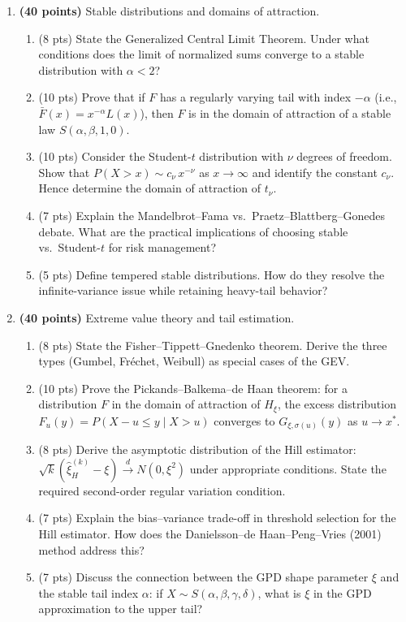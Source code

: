 \documentclass[11pt, a4paper]{article}
\theoremstyle{definition}
\begin{document}
\begin{enumerate}[label=\textbf{PhD-Q\arabic*.}]

\item \textbf{(40 points)} Stable distributions and domains of attraction.

\begin{enumerate}[label=(\alph*)]
  \item (8 pts) State the Generalized Central Limit Theorem. Under what conditions does the limit of normalized sums converge to a stable distribution with $\alpha < 2$?
  \item (10 pts) Prove that if $F$ has a regularly varying tail with index $-\alpha$ (i.e., $\bar{F}(x) = x^{-\alpha}L(x)$), then $F$ is in the domain of attraction of a stable law $S(\alpha, \beta, 1, 0)$.
  \item (10 pts) Consider the Student-$t$ distribution with $\nu$ degrees of freedom. Show that $P(X > x) \sim c_\nu\,x^{-\nu}$ as $x \to \infty$ and identify the constant $c_\nu$. Hence determine the domain of attraction of $t_\nu$.
  \item (7 pts) Explain the Mandelbrot--Fama vs.\ Praetz--Blattberg--Gonedes debate. What are the practical implications of choosing stable vs.\ Student-$t$ for risk management?
  \item (5 pts) Define tempered stable distributions. How do they resolve the infinite-variance issue while retaining heavy-tail behavior?
\end{enumerate}

\item \textbf{(40 points)} Extreme value theory and tail estimation.

\begin{enumerate}[label=(\alph*)]
  \item (8 pts) State the Fisher--Tippett--Gnedenko theorem. Derive the three types (Gumbel, Fréchet, Weibull) as special cases of the GEV.
  \item (10 pts) Prove the Pickands--Balkema--de Haan theorem: for a distribution $F$ in the domain of attraction of $H_\xi$, the excess distribution $F_u(y) = P(X - u \leq y \mid X > u)$ converges to $G_{\xi, \sigma(u)}(y)$ as $u \to x^*$.
  \item (8 pts) Derive the asymptotic distribution of the Hill estimator: $\sqrt{k}(\hat{\xi}_H^{(k)} - \xi) \xrightarrow{d} N(0, \xi^2)$ under appropriate conditions. State the required second-order regular variation condition.
  \item (7 pts) Explain the bias--variance trade-off in threshold selection for the Hill estimator. How does the Danielsson--de Haan--Peng--Vries (2001) method address this?
  \item (7 pts) Discuss the connection between the GPD shape parameter $\xi$ and the stable tail index $\alpha$: if $X \sim S(\alpha, \beta, \gamma, \delta)$, what is $\xi$ in the GPD approximation to the upper tail?
\end{enumerate}


\end{enumerate}
\end{document}
